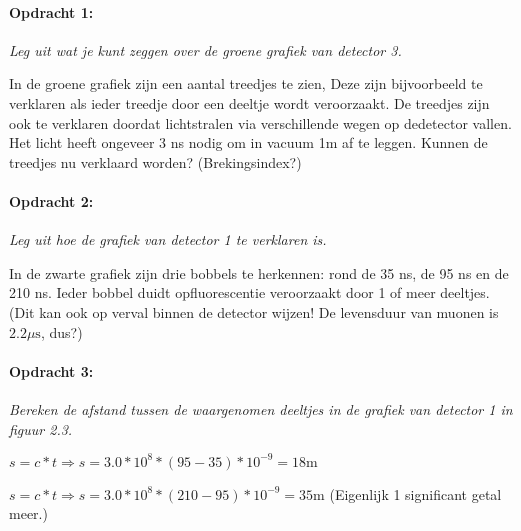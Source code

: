 \begin{minipage}[t]{1\columnwidth}%

\paragraph{Opdracht 1:}

\textit{Leg uit wat je kunt zeggen over de groene grafiek van detector
3. }

In de groene grafiek zijn een aantal treedjes te zien, Deze zijn bijvoorbeeld
te verklaren als ieder treedje door een deeltje wordt veroorzaakt.
De treedjes zijn ook te verklaren doordat lichtstralen via verschillende
wegen op dedetector vallen. Het licht heeft ongeveer 3 ns nodig om
in vacuum 1m af te leggen. Kunnen de treedjes nu verklaard worden?
(Brekingsindex?)

\end{minipage}

\begin{minipage}[t]{1\columnwidth}%

\paragraph{Opdracht 2:}

\textit{Leg uit hoe de grafiek van detector 1 te verklaren is.}

In de zwarte grafiek zijn drie bobbels te herkennen: rond de 35 ns,
de 95 ns en de 210 ns. Ieder bobbel duidt opfluorescentie veroorzaakt
door 1 of meer deeltjes. (Dit kan ook op verval binnen de detector
wijzen! De levensduur van muonen is $2.2\mu\mathrm{s}$, dus?)

\end{minipage}

\begin{minipage}[t]{1\columnwidth}%

\paragraph{Opdracht 3:}

\textit{Bereken de afstand tussen de waargenomen deeltjes in de grafiek
van detector 1 in figuur 2.3.}

$s=c*t\Rightarrow s=3.0*10^{8}*\left(95-35\right)*10^{-9}=18\mathrm{m}$

$s=c*t\Rightarrow s=3.0*10^{8}*\left(210-95\right)*10^{-9}=35\mathrm{m}$
(Eigenlijk 1 significant getal meer.)
\end{minipage}


